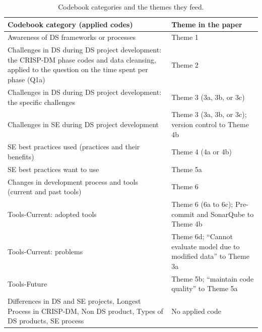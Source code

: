 \documentclass[11pt]{article}
\begin{document}
\begin{table}[h]
\centering
\caption{Codebook categories and the themes they feed.}
\label{tab:supp_category_theme}
\begin{tabular}{@{}p{7.5cm} p{7cm}@{}}
\toprule
\textbf{Codebook category (applied codes)} & \textbf{Theme in the paper} \\
\midrule
Awareness of DS frameworks or processes & Theme 1 \\
Challenges in DS during DS project development: the CRISP-DM phase codes and data cleansing, applied to the question on the time spent per phase (Q1a) & Theme 2 \\
Challenges in DS during DS project development: the specific challenges & Theme 3 (3a, 3b, or 3c) \\
Challenges in SE during DS project development & Theme 3 (3a, 3b, or 3c); version control to Theme 4b \\
SE best practices used (practices and their benefits) & Theme 4 (4a or 4b) \\
SE best practices want to use & Theme 5a \\
Changes in development process and tools (current and past tools) & Theme 6 \\
Tools-Current: adopted tools & Theme 6 (6a to 6c); Pre-commit and SonarQube to Theme 4b \\
Tools-Current: problems & Theme 6d; ``Cannot evaluate model due to modified data'' to Theme 3a \\
Tools-Future & Theme 5b; ``maintain code quality'' to Theme 5a \\
Differences in DS and SE projects, Longest Process in CRISP-DM, Non DS product, Types of DS products, SE process & No applied code \\
\bottomrule
\end{tabular}
\end{table}
\end{document}
